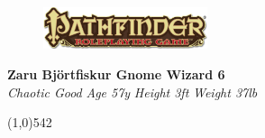 \documentclass[letterpaper]{article}
\newcommand{\fullline}{\noindent\line(1,0){542} \\}
\begin{document}
\sffamily
\begin{figure}
\vspace{-1.5em}
\includegraphics[width=13em]{Pathfinder}
\end{figure}
\noindent \textbf{\huge{Zaru Bj\"{o}rtfiskur }\Large{Gnome Wizard 6}} \\
\emph{Chaotic Good} \hspace{2em} \emph{Age 57y} \hspace{2em} \emph{Height 3ft} \hspace{2em} \emph{Weight 37lb} \par
\vspace{-0.75em}

\fullline
\end{document}
